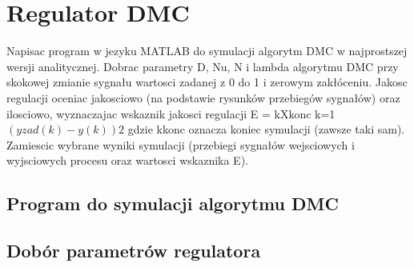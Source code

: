\section{Regulator DMC}

Napisac program w jezyku MATLAB do symulacji algorytm DMC w najprostszej
wersji analitycznej. Dobrac parametry D, Nu, N i lambda algorytmu DMC przy skokowej
zmianie sygnału wartosci zadanej z 0 do 1 i zerowym zakłóceniu. Jakosc regulacji
oceniac jakosciowo (na podstawie rysunków przebiegów sygnałów) oraz ilosciowo, wyznaczajac
wskaznik jakosci regulacji
E =
kXkonc
k=1
$(yzad(k) - y(k))2$
gdzie kkonc oznacza koniec symulacji (zawsze taki sam). Zamiescic wybrane wyniki
symulacji (przebiegi sygnałów wejsciowych i wyjsciowych procesu oraz wartosci wskaznika
E).

\subsection{Program do symulacji algorytmu DMC}

\subsection{Dobór parametrów regulatora}
